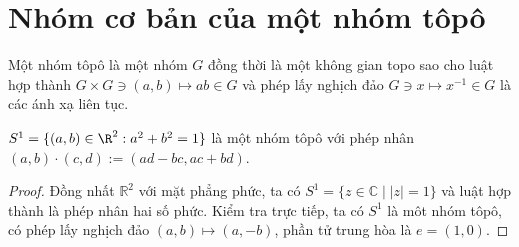 \section{Nhóm cơ bản của một nhóm tôpô}

\begin{definition}
	Một nhóm tôpô là một nhóm $G$ đồng thời là một không gian topo sao cho luật hợp thành $G\times G \ni (a,b) \mapsto ab\in G$ và phép lấy nghịch đảo $G\ni x\mapsto x^{-1} \in G$ là các ánh xạ liên tục.
\end{definition}
\begin{example}
	$S^1=\{(a,b)\in \R^2:a^2+b^2=1\}$ là một nhóm tôpô với phép nhân $(a,b)\cdot (c,d):= (ad-bc,ac+bd)$.
\end{example}
\begin{proof} Đồng nhất $\mathbb{R}^2$ với mặt phẳng phức, ta có
	$S^1=\{z\in \mathbb{C}\;|\; |z|=1\}$ và luật hợp thành là phép nhân hai số phức. Kiểm tra trực tiếp, ta có $S^1$ là môt nhóm tôpô, có phép lấy nghịch đảo $(a,b)\mapsto (a,-b)$, phần tử trung hòa là $e=(1,0)$.
\end{proof}


 
